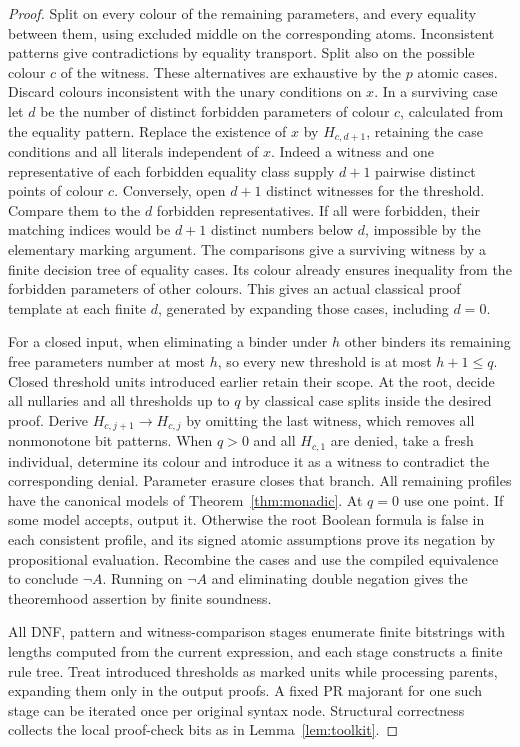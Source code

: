 \begin{proof}
Split on every colour of the remaining parameters, and every equality between them, using excluded middle on the corresponding atoms. Inconsistent patterns give contradictions by equality transport. Split also on the possible colour $c$ of the witness. These alternatives are exhaustive by the $p$ atomic cases. Discard colours inconsistent with the unary conditions on $x$. In a surviving case let $d$ be the number of distinct forbidden parameters of colour $c$, calculated from the equality pattern. Replace the existence of $x$ by $H_{c,d+1}$, retaining the case conditions and all literals independent of $x$. Indeed a witness and one representative of each forbidden equality class supply $d+1$ pairwise distinct points of colour $c$. Conversely, open $d+1$ distinct witnesses for the threshold. Compare them to the $d$ forbidden representatives. If all were forbidden, their matching indices would be $d+1$ distinct numbers below $d$, impossible by the elementary marking argument. The comparisons give a surviving witness by a finite decision tree of equality cases. Its colour already ensures inequality from the forbidden parameters of other colours. This gives an actual classical proof template at each finite $d$, generated by expanding those cases, including $d=0$.

For a closed input, when eliminating a binder under $h$ other binders its remaining free parameters number at most $h$, so every new threshold is at most $h+1\le q$. Closed threshold units introduced earlier retain their scope. At the root, decide all nullaries and all thresholds up to $q$ by classical case splits inside the desired proof. Derive $H_{c,j+1}\to H_{c,j}$ by omitting the last witness, which removes all nonmonotone bit patterns. When $q>0$ and all $H_{c,1}$ are denied, take a fresh individual, determine its colour and introduce it as a witness to contradict the corresponding denial. Parameter erasure closes that branch. All remaining profiles have the canonical models of Theorem~\ref{thm:monadic}. At $q=0$ use one point. If some model accepts, output it. Otherwise the root Boolean formula is false in each consistent profile, and its signed atomic assumptions prove its negation by propositional evaluation. Recombine the cases and use the compiled equivalence to conclude $\neg A$. Running on $\neg A$ and eliminating double negation gives the theoremhood assertion by finite soundness.

All DNF, pattern and witness-comparison stages enumerate finite bitstrings with lengths computed from the current expression, and each stage constructs a finite rule tree. Treat introduced thresholds as marked units while processing parents, expanding them only in the output proofs. A fixed PR majorant for one such stage can be iterated once per original syntax node. Structural correctness collects the local proof-check bits as in Lemma~\ref{lem:toolkit}.
\end{proof}

